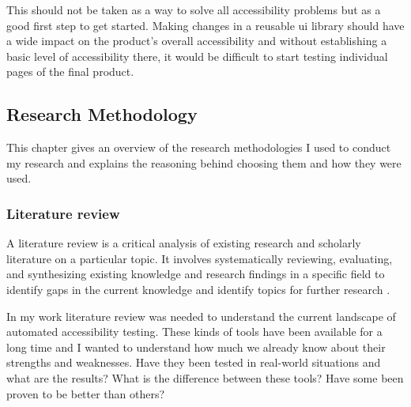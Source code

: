 \documentclass{master_thesis}
\begin{document}
This should not be taken as a way to solve all accessibility problems but as a good first step to get started. Making changes in a reusable \ac{ui} library should have a wide impact on the product's overall accessibility and without establishing a basic level of accessibility there, it would be difficult to start testing individual pages of the final product.

\subsection{Research Methodology}


This chapter gives an overview of the research methodologies I used to conduct my research and explains the reasoning behind choosing them and how they were used.



\subsubsection{Literature review}

A literature review is a critical analysis of existing research and scholarly literature on a particular topic. It involves systematically reviewing, evaluating, and synthesizing existing knowledge and research findings in a specific field to identify gaps in the current knowledge and identify topics for further research \citep{Luft2022}.

In my work literature review was needed to understand the current landscape of automated accessibility testing. These kinds of tools have been available for a long time and I wanted to understand how much we already know about their strengths and weaknesses. Have they been tested in real-world situations and what are the results? What is the difference between these tools? Have some been proven to be better than others?
\end{document}
